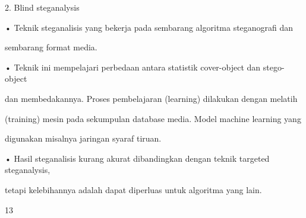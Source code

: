 \documentclass{article}
\begin{document}

2. Blind steganalysis

• Teknik steganalisis yang bekerja pada sembarang algoritma steganografi dan 

sembarang format media.

• Teknik ini mempelajari perbedaan antara statistik cover-object dan stego-object 

dan membedakannya. Proses pembelajaran (learning) dilakukan dengan melatih 

(training) mesin pada sekumpulan database media. Model machine learning yang 

digunakan misalnya jaringan syaraf tiruan.

• Hasil steganalisis kurang akurat dibandingkan dengan teknik targeted steganalysis, 

tetapi kelebihannya adalah dapat diperluas untuk algoritma yang lain.

13
\end{document}
